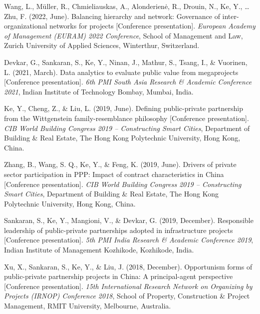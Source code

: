 \documentclass[11pt,a4paper]{report} %
\begin{document}
\begin{tablist}
        \item[2022] \tab{}Wang, L., Müller, R., Chmieliauskas, A., Alonderienė, R., Drouin, N., Ke, Y., \ldots Zhu, F. (2022, June). Balancing hierarchy and network: Governance of inter-organizational networks for projects [Conference presentation]. \textit{European Academy of Management (EURAM) 2022 Conference}, School of Management and Law, Zurich University of Applied Sciences, Winterthur, Switzerland.
        
        \item[2021] \tab{}Devkar, G., Sankaran, S., Ke, Y., Ninan, J., Mathur, S., Tsang, I., \& Vuorinen, L. (2021, March). Data analytics to evaluate public value from megaprojects [Conference presentation]. \textit{6th PMI South Asia Research \& Academic Conference 2021}, Indian Institute of Technology Bombay, Mumbai, India.
        
        \item[2019] \tab{}Ke, Y., Cheng, Z., \& Liu, L. (2019, June). Defining public-private partnership from the Wittgenstein family-resemblance philosophy [Conference presentation]. \textit{CIB World Building Congress 2019 -- Constructing Smart Cities}, Department of Building \& Real Estate, The Hong Kong Polytechnic University, Hong Kong, China.
        
        \item[2019] \tab{}Zhang, B., Wang, S. Q., Ke, Y., \& Feng, K. (2019, June). Drivers of private sector participation in PPP: Impact of contract characteristics in China [Conference presentation]. \textit{CIB World Building Congress 2019 -- Constructing Smart Cities}, Department of Building \& Real Estate, The Hong Kong Polytechnic University, Hong Kong, China.
        
        \item[2019] \tab{}Sankaran, S., Ke, Y., Mangioni, V., \& Devkar, G. (2019, December). Responsible leadership of public-private partnerships adopted in infrastructure projects [Conference presentation]. \textit{5th PMI India Research \& Academic Conference 2019}, Indian Institute of Management Kozhikode, Kozhikode, India.
        
        \item[2018] \tab{}Xu, X., Sankaran, S., Ke, Y., \& Liu, J. (2018, December). Opportunism forms of public-private partnership projects in China: A principal-agent perspective [Conference presentation]. \textit{15th International Research Network on Organizing by Projects (IRNOP) Conference 2018}, School of Property, Construction \& Project Management, RMIT University, Melbourne, Australia.
        

\end{tablist}
\end{document}
